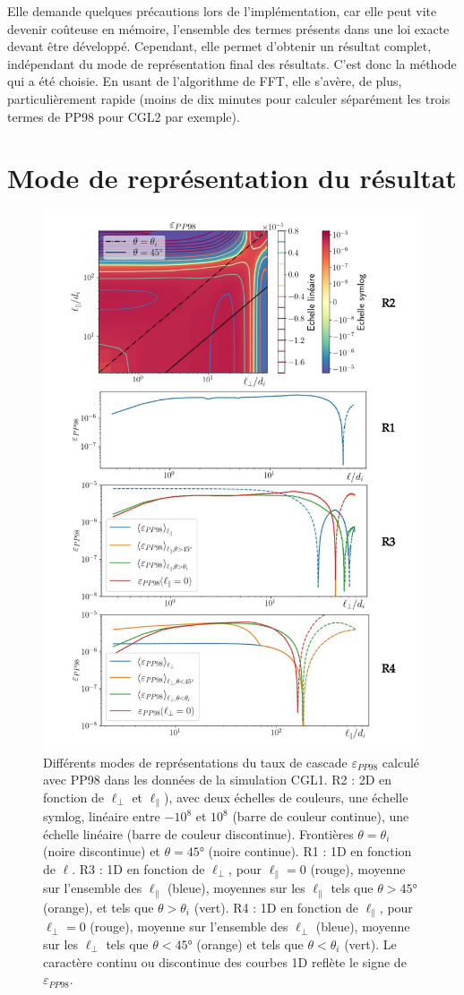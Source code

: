 Elle demande quelques précautions lors de l'implémentation, car elle peut vite devenir coûteuse en mémoire, l'ensemble des termes présents dans une loi exacte devant être développé. Cependant, elle permet d'obtenir un résultat complet, indépendant du mode de représentation final des résultats. C'est donc la méthode qui a été choisie. En usant de l'algorithme de \ac{FFT}, elle s'avère, de plus, particulièrement rapide (moins de dix minutes pour calculer séparément les trois termes de \acs{PP98} pour CGL2 par exemple).

\section{Mode de représentation du résultat}
\label{sec-313}
\begin{figure}[!ht]
 \centering
\includegraphics[width=0.75\linewidth,trim=1cm 0.5cm 1cm 0.5cm, clip=true]{./Part_3/images_ch1/rep_CGL1}
\cprotect\caption{Différents modes de représentations du taux de cascade $\varepsilon_{PP98}$ calculé avec PP98 dans les données de la simulation CGL1. R2 : \acs{2D} en fonction de $\ell_{\perp}$ et $\ell_{\parallel}$), avec deux échelles de couleurs, une échelle symlog, linéaire entre $-10^8$ et $10^8$ (barre de couleur continue), une échelle linéaire (barre de couleur discontinue). Frontières $\theta = \theta_i$ (noire discontinue) et $\theta = \ang{45}$ (noire continue). R1 : \acs{1D} en fonction de $\ell$. R3 : \acs{1D} en fonction de $\ell_{\perp}$, pour $\ell_{\parallel} = 0$ (rouge), moyenne sur l'ensemble des $\ell_{\parallel}$ (bleue), moyennes sur les $\ell_{\parallel}$ tels que $\theta > \ang{45}$ (orange), et tels que $\theta > \theta_i$ (vert). R4 : \acs{1D} en fonction de $\ell_{\parallel}$, pour $\ell_{\perp} = 0$ (rouge), moyenne sur l'ensemble des $\ell_{\perp}$ (bleue), moyenne sur les $\ell_{\perp}$ tels que $\theta < \ang{45}$ (orange) et tels que $\theta < \theta_i$ (vert). Le caractère continu ou discontinue des courbes \acs{1D} reflète le signe de $\varepsilon_{PP98}$. }

\end{figure}
